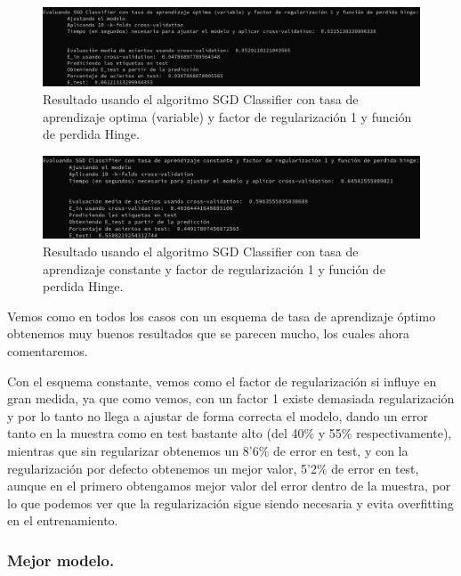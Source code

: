 \documentclass[12pt, spanish]{article}
\begin{document}
\begin{figure}[H]
	\centering
	\hspace*{-1cm}\includegraphics[scale=0.4]{clasificacion/sgdH1.png}
	\caption{Resultado usando el algoritmo SGD Classifier con tasa de aprendizaje optima (variable) y factor de regularización 1 y función de perdida Hinge.}
	\label{SGDL001}
\end{figure}

\begin{figure}[H]
	\centering
	\hspace*{-1cm}\includegraphics[scale=0.4]{clasificacion/sgdH1c.png}
	\caption{Resultado usando el algoritmo SGD Classifier con tasa de aprendizaje constante y factor de regularización 1 y función de perdida Hinge.}
	\label{SGDL001}
\end{figure}


Vemos como en todos los casos con un esquema de tasa de aprendizaje óptimo obtenemos muy buenos resultados que se parecen mucho, los cuales ahora comentaremos.

Con el esquema constante, vemos como el factor de regularización si influye en gran medida, ya que como vemos, con un factor 1 existe demasiada regularización y por lo tanto no llega a ajustar de forma correcta el modelo, dando un error tanto en la muestra como en test bastante alto (del 40\% y 55\% respectivamente), mientras que sin regularizar obtenemos un 8'6\% de error en test, y con la regularización por defecto obtenemos un mejor valor, 5'2\% de error en test, aunque en el primero obtengamos mejor valor del error dentro de la muestra, por lo que podemos ver que la regularización sigue siendo necesaria y evita overfitting en el entrenamiento.


\subsubsection{Mejor modelo.}
\end{document}
